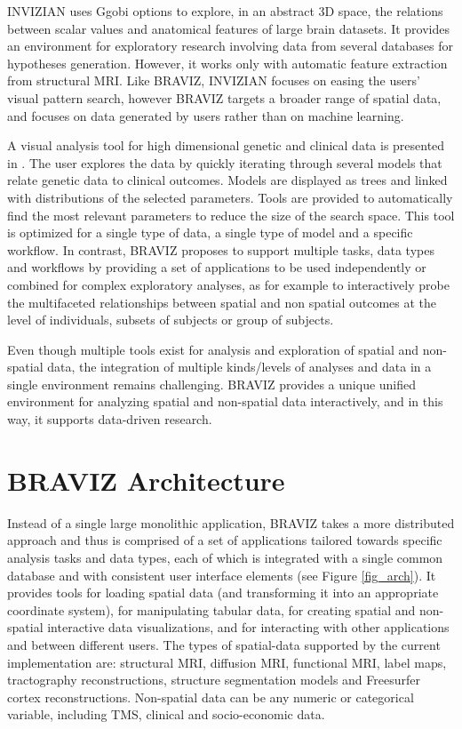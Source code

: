 \documentclass{frontiersHLTH}
\begin{document}
INVIZIAN \cite{bowman_query-based_2011, bowman_feature-similarity_2012, bowman_visual_2012} uses Ggobi options to explore, in an abstract 3D space, the relations between scalar values and anatomical features of large brain datasets. It provides an environment for exploratory research involving data from several databases for hypotheses generation. However, it works only with automatic feature extraction from structural MRI. Like BRAVIZ, INVIZIAN focuses on easing the users' visual pattern search, however BRAVIZ targets a broader range of spatial data, and focuses on data generated by users rather than on machine learning. 


A visual analysis tool for high dimensional genetic and clinical data is presented in \cite{hinterberg_peax:_2014}. The user explores the data by quickly iterating through several models that relate genetic data to clinical outcomes. Models are displayed as trees and linked with distributions of the selected parameters. Tools are provided to automatically find the most relevant parameters to reduce the size of the search space. This tool is optimized for a single type of data, a single type of model and a specific workflow. In contrast, BRAVIZ proposes to support multiple tasks, data types and workflows by providing a set of  applications to be used independently or combined for complex exploratory analyses, as for example to interactively probe the multifaceted relationships between spatial and non spatial outcomes at the level of individuals, subsets of subjects or group of subjects.
	
Even though multiple tools  exist for analysis and exploration of spatial and non-spatial data, the integration of multiple kinds/levels of analyses and data in a single environment remains challenging. BRAVIZ provides a unique unified environment for analyzing spatial and non-spatial data interactively, and in this way, it supports data-driven research.

\section{BRAVIZ Architecture}

Instead of a single large monolithic application, BRAVIZ takes a more distributed approach and thus is comprised of a set of applications tailored towards specific analysis tasks and data types, each of which is integrated with a single common database and with consistent user interface elements (see Figure \ref{fig_arch}). It provides tools for loading spatial data (and transforming it into an appropriate coordinate system), for manipulating tabular data, for creating spatial and non-spatial interactive data visualizations, and for interacting with other applications and between different users. The types of spatial-data supported by the current implementation are: structural MRI, diffusion MRI, functional MRI, label maps, tractography reconstructions, structure segmentation models and Freesurfer cortex reconstructions. Non-spatial data can be any numeric or categorical variable, including TMS, clinical and socio-economic data.
\end{document}

